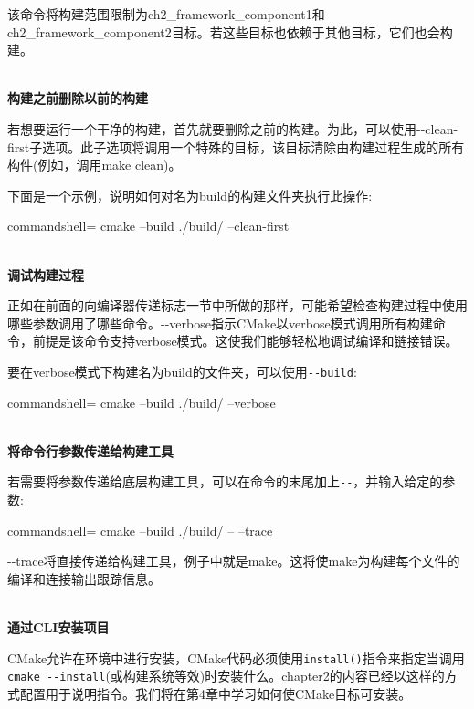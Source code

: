 该命令将构建范围限制为ch2\_framework\_component1和ch2\_framework\_component2目标。若这些目标也依赖于其他目标，它们也会构建。

\hspace*{\fill} \\ %
\noindent
\textbf{构建之前删除以前的构建}

若想要运行一个干净的构建，首先就要删除之前的构建。为此，可以使用-{}-clean-first子选项。此子选项将调用一个特殊的目标，该目标清除由构建过程生成的所有构件(例如，调用make clean)。

下面是一个示例，说明如何对名为build的构建文件夹执行此操作:

\begin{tcblisting}{commandshell={}}
cmake --build ./build/ --clean-first
\end{tcblisting}

\hspace*{\fill} \\ %
\noindent
\textbf{调试构建过程}

正如在前面的向编译器传递标志一节中所做的那样，可能希望检查构建过程中使用哪些参数调用了哪些命令。-{}-verbose指示CMake以verbose模式调用所有构建命令，前提是该命令支持verbose模式。这使我们能够轻松地调试编译和链接错误。

要在verbose模式下构建名为build的文件夹，可以使用\texttt{-{}-build}:

\begin{tcblisting}{commandshell={}}
cmake --build ./build/ --verbose
\end{tcblisting}

\hspace*{\fill} \\ %
\noindent
\textbf{将命令行参数传递给构建工具}

若需要将参数传递给底层构建工具，可以在命令的末尾加上\texttt{-{}-}，并输入给定的参数:

\begin{tcblisting}{commandshell={}}
cmake --build ./build/ -- --trace
\end{tcblisting}

-{}-trace将直接传递给构建工具，例子中就是make。这将使make为构建每个文件的编译和连接输出跟踪信息。

\hspace*{\fill} \\ %
\noindent
\textbf{通过CLI安装项目}

CMake允许在环境中进行安装，CMake代码必须使用\texttt{install()}指令来指定当调用\texttt{cmake -{}-install}(或构建系统等效)时安装什么。chapter2的内容已经以这样的方式配置用于说明指令。我们将在第4章中学习如何使CMake目标可安装。

